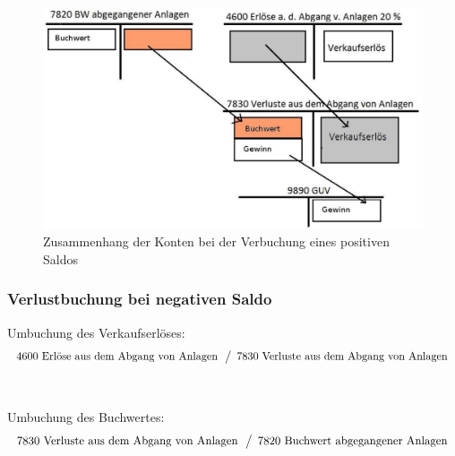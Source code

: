 \documentclass[a4paper,10pt]{report}
\begin{document}
\begin{figure}[ht]
\centering
\includegraphics[width=14cm]{Bilder/Gewinnumbuchung-Konten_der_Bilanz}
\caption{Zusammenhang der Konten bei der Verbuchung eines positiven
Saldos}
\end{figure}
\pagebreak

\subsubsection{Verlustbuchung bei negativen Saldo}
Umbuchung des Verkaufserlöses:
\begin{equation*}
  \begin{array}{l}
    \text{4600 Erlöse aus dem Abgang von Anlagen}\\
  \end{array}
  \left\slash
    \begin{array}{l}
      \text{7830 Verluste aus dem Abgang von Anlagen}\\
    \end{array}
  \right.
\end{equation*}\\
\\
Umbuchung des Buchwertes:
\begin{equation*}
  \begin{array}{l}
    \text{7830 Verluste aus dem Abgang von Anlagen}\\
  \end{array}
  \left\slash
    \begin{array}{l}
      \text{7820 Buchwert abgegangener Anlagen}\\
    \end{array}
  \right.
\end{equation*}
\end{document}
